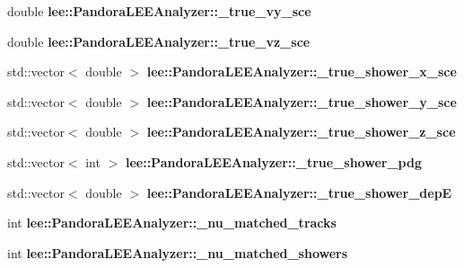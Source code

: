 \begin{DoxyCompactItemize}
\item 
\hypertarget{group__lee_ga1ea9a05e0b69aca1c22072cae8482b81}{double {\bfseries lee\-::\-Pandora\-L\-E\-E\-Analyzer\-::\-\_\-true\-\_\-vy\-\_\-sce}}\label{group__lee_ga1ea9a05e0b69aca1c22072cae8482b81}

\item 
\hypertarget{group__lee_ga5ac99bc027e85044950f2f502d3fffb0}{double {\bfseries lee\-::\-Pandora\-L\-E\-E\-Analyzer\-::\-\_\-true\-\_\-vz\-\_\-sce}}\label{group__lee_ga5ac99bc027e85044950f2f502d3fffb0}

\item 
\hypertarget{group__lee_ga5a4c4d805d124adaddb51a03be0af692}{std\-::vector$<$ double $>$ {\bfseries lee\-::\-Pandora\-L\-E\-E\-Analyzer\-::\-\_\-true\-\_\-shower\-\_\-x\-\_\-sce}}\label{group__lee_ga5a4c4d805d124adaddb51a03be0af692}

\item 
\hypertarget{group__lee_ga2509960b89cf002d160e0c298575eafd}{std\-::vector$<$ double $>$ {\bfseries lee\-::\-Pandora\-L\-E\-E\-Analyzer\-::\-\_\-true\-\_\-shower\-\_\-y\-\_\-sce}}\label{group__lee_ga2509960b89cf002d160e0c298575eafd}

\item 
\hypertarget{group__lee_gacb0f3d491c4acf888d0a787624627b57}{std\-::vector$<$ double $>$ {\bfseries lee\-::\-Pandora\-L\-E\-E\-Analyzer\-::\-\_\-true\-\_\-shower\-\_\-z\-\_\-sce}}\label{group__lee_gacb0f3d491c4acf888d0a787624627b57}

\item 
\hypertarget{group__lee_gac1f312260669f165f847286e4512224d}{std\-::vector$<$ int $>$ {\bfseries lee\-::\-Pandora\-L\-E\-E\-Analyzer\-::\-\_\-true\-\_\-shower\-\_\-pdg}}\label{group__lee_gac1f312260669f165f847286e4512224d}

\item 
\hypertarget{group__lee_ga4f376ec3a74610d2b6e5ea3be722182c}{std\-::vector$<$ double $>$ {\bfseries lee\-::\-Pandora\-L\-E\-E\-Analyzer\-::\-\_\-true\-\_\-shower\-\_\-dep\-E}}\label{group__lee_ga4f376ec3a74610d2b6e5ea3be722182c}

\item 
\hypertarget{group__lee_gae2fc3e074f12a2847d68b4e3192c1151}{int {\bfseries lee\-::\-Pandora\-L\-E\-E\-Analyzer\-::\-\_\-nu\-\_\-matched\-\_\-tracks}}\label{group__lee_gae2fc3e074f12a2847d68b4e3192c1151}

\item 
\hypertarget{group__lee_gab254eacbf12abc1ac43236dfd2f7da16}{int {\bfseries lee\-::\-Pandora\-L\-E\-E\-Analyzer\-::\-\_\-nu\-\_\-matched\-\_\-showers}}\label{group__lee_gab254eacbf12abc1ac43236dfd2f7da16}


\end{DoxyCompactItemize}
